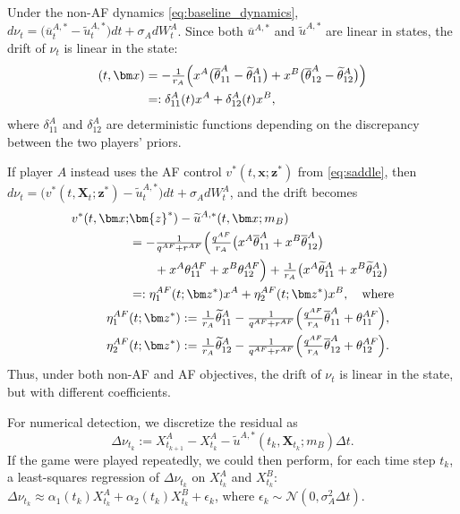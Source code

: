\documentclass[letterpaper, 10 pt, conference]{ieeeconf}
\begin{document}
Under the non-AF dynamics \eqref{eq:baseline_dynamics}, $d\nu_t = \big(\overline{u}_t^{A,\ast} - \widetilde{u}^{A,\ast}_t\big) dt + \sigma_AdW_t^A$.
Since both \(\overline u^{A,*}\) and \(\widetilde u^{A,*}\) are linear in states, the drift of $\nu_t$ is linear in the state:
\begin{align*}
    [\overline{u}^{A,\ast} - \widetilde{u}^{A,\ast}](t, \bm x) &= -\tfrac{1}{r_A}\Big(x^A\big(\overline{\theta}_{11}^A - \widetilde{\theta}_{11}^A\big) + x^B\big(\overline{\theta}_{12}^A - \widetilde{\theta}_{12}^A\big)\Big) \notag \\
    &=: \delta_{11}^A(t) x^A + \delta_{12}^A(t)x^B,
\end{align*}
where  $\delta_{11}^A$ and $\delta_{12}^A$ are deterministic functions depending on the discrepancy between the two players' priors.

If player \(A\) instead uses the AF control \(v^*(t, \bm x; \bm z^*)\) from \eqref{eq:saddle}, then $d\nu_t = \big(v^{\ast}(t, \bm X_t; \bm{z}^\ast) - \widetilde{u}_t^{A,\ast}\big) dt + \sigma_A dW_t^A$,
and the drift becomes
\begin{align*}
    v^\ast(t, \bm x; &\bm{z}^\ast) - \widetilde{u}^{A,\ast}(t, \bm x; m_B) \\
    &= -\tfrac{1}{ q^{AF}+ r^{AF}}\Big(\tfrac{ q^{AF}}{r_A}\big(x^A \overline{\theta}_{11}^A + x^B \overline{\theta}_{12}^A\big) \notag\\
    &\qquad + x^A \theta_{11}^{AF} + x^B \theta_{12}^{AF}\Big) + \tfrac{1}{r_A}\big(x^A \widetilde{\theta}_{11}^A + x^B \widetilde{\theta}_{12}^A\big) \notag \\
    &=: \eta_{1}^{AF}(t; \bm z^\ast) x^A + \eta_{2}^{AF}(t; \bm z^\ast) x^B, \quad\text{where} \\
    \eta_1^{AF}&(t; \bm z^\ast) := \tfrac{1}{r_A}\widetilde{\theta}_{11}^A - \tfrac{1}{ q^{AF}+ r^{AF}}\Big(\tfrac{ q^{AF}}{r_A}\overline{\theta}_{11}^A + \theta_{11}^{AF}\Big), \\
    \eta_2^{AF}&(t; \bm z^\ast) := \tfrac{1}{r_A}\widetilde{\theta}_{12}^A - \tfrac{1}{ q^{AF}+ r^{AF}}\Big(\tfrac{ q^{AF}}{r_A}\overline{\theta}_{12}^A + \theta_{12}^{AF}\Big).
\end{align*}
Thus, under both non-AF and AF objectives, the drift of $\nu_t$ is linear in the state, but with different coefficients.

For numerical detection, we discretize the residual as
\[
    \Delta\nu_{t_k}
    :=
    X_{t_{k+1}}^A-X_{t_k}^A-\widetilde u^{A,*}(t_k,\bm X_{t_k}; m_B)\Delta t.
\]
If the game were played repeatedly, we could then perform, for each time step \(t_k\), a least-squares regression of \(\Delta\nu_{t_k}\) on \(X_{t_k}^A\) and \(X_{t_k}^B\): $
    \Delta\nu_{t_k}
    \approx
    \alpha_1(t_k)X_{t_k}^A+\alpha_2(t_k)X_{t_k}^B+\epsilon_k$,
where \(\epsilon_k\sim\mathcal N(0,\sigma_A^2\Delta t)\).
\end{document}

